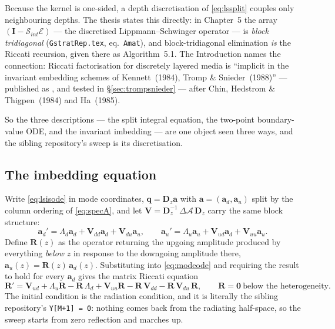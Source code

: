 \documentclass[11pt,a4paper]{article}
\newcommand{\bI}{\mathbf{I}}
\newcommand{\bV}{\mathbf{V}}
\newcommand{\bq}{\mathbf{q}}
\newcommand{\dA}{\Delta\mathcal{A}}
\newcommand{\bR}{\mathbf{R}}
\begin{document}
Because the kernel is one-sided, a depth discretisation of \eqref{eq:lssplit}
couples only neighbouring depths.  The thesis states this directly: in
Chapter~5 the array $(\bI - \mathcal{S}_{int}\mathcal{E})$ --- the discretised
Lippmann--Schwinger operator --- is \emph{block tridiagonal}
(\texttt{GstratRep.tex}, eq.~\texttt{Amat}), and block-tridiagonal elimination
\emph{is} the Riccati recursion, given there as Algorithm~5.1.  The
Introduction names the connection: Riccati factorisation for discretely layered
media is ``implicit in the invariant embedding schemes of Kennett~(1984),
Tromp \& Snieder~(1988)'' --- published as \cite{tromp1989}, and tested in \S\ref{sec:trompsnieder} --- after Chin, Hedstrom \& Thigpen~(1984) and Ha~(1985).

So the three descriptions --- the split integral equation, the two-point
boundary-value ODE, and the invariant imbedding --- are one object seen three
ways, and the sibling repository's sweep is its discretisation.

\subsection{The imbedding equation}

Write \eqref{eq:lsisode} in mode coordinates, $\bq = \mathbf{D}_z\mathbf{a}$ with
$\mathbf{a} = (\mathbf{a}_d,\mathbf{a}_u)$ split by the column ordering of
\eqref{eq:specA}, and let
$\bV = \mathbf{D}_z^{-1}\,\dA\,\mathbf{D}_z$ carry the same block structure:
\begin{equation}\label{eq:modeode}
  \mathbf{a}_d' = \Lambda_d\mathbf{a}_d + \bV_{dd}\mathbf{a}_d + \bV_{du}\mathbf{a}_u,
  \qquad
  \mathbf{a}_u' = \Lambda_u\mathbf{a}_u + \bV_{ud}\mathbf{a}_d + \bV_{uu}\mathbf{a}_u .
\end{equation}
Define $\bR(z)$ as the operator returning the upgoing amplitude produced by
everything \emph{below} $z$ in response to the downgoing amplitude there,
$\mathbf{a}_u(z) = \bR(z)\,\mathbf{a}_d(z)$.  Substituting into
\eqref{eq:modeode} and requiring the result to hold for every $\mathbf{a}_d$
gives the matrix Riccati equation
\begin{equation}\label{eq:riccatiR}
  \bR' = \bV_{ud}
        + \Lambda_u\bR - \bR\,\Lambda_d
        + \bV_{uu}\bR - \bR\,\bV_{dd}
        - \bR\,\bV_{du}\,\bR ,
  \qquad \bR = \mathbf{0} \ \text{below the heterogeneity}.
\end{equation}
The initial condition is the radiation condition, and it is literally the
sibling repository's \texttt{Y[M+1] = 0}: nothing comes back from the radiating
half-space, so the sweep starts from zero reflection and marches up.
\end{document}
